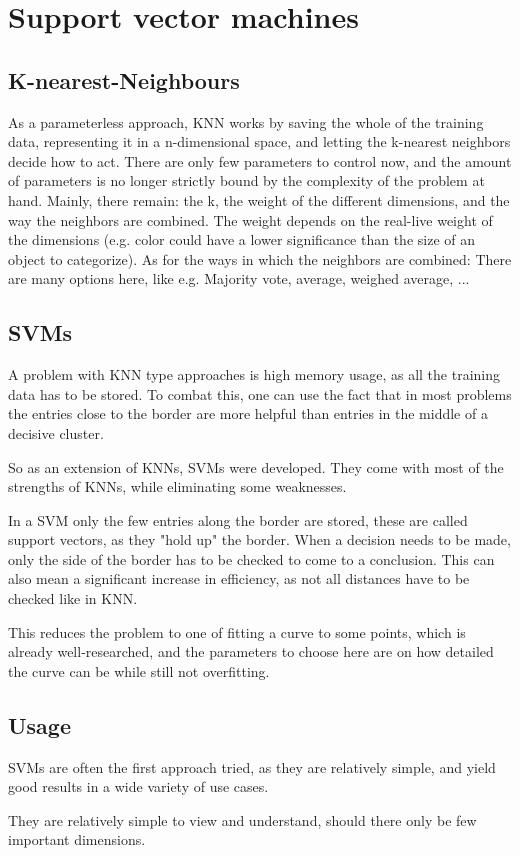 \section{Support vector machines}
\label{sec:SVM}
\subsection{K-nearest-Neighbours}
As a parameterless approach, KNN works by saving the whole of the training data, representing it in a n-dimensional space, and letting the k-nearest neighbors decide how to act. There are only few parameters to control now, and the amount of parameters is no longer strictly bound by the complexity of the problem at hand. Mainly, there remain: the k, the weight of the different dimensions, and the way the neighbors are combined. 
The weight depends on the real-live weight of the dimensions (e.g. color could have a lower significance than the size of an object to categorize).
As for the ways in which the neighbors are combined: There are many options here, like e.g. Majority vote, average, weighed average, ...
\subsection{SVMs}
A problem with KNN type approaches is high memory usage, as all the training data has to be stored. To combat this, one can use the fact that in most problems the entries close to the border are more helpful than entries in the middle of a decisive cluster.

So as an extension of KNNs, SVMs were developed. They come with most of the strengths of KNNs, while eliminating some weaknesses.

In a SVM only the few entries along the border are stored, these are called support vectors, as they "hold up" the border. When a decision needs to be made, only the side of the border has to be checked to come to a conclusion. This can also mean a significant increase in efficiency, as not all distances have to be checked like in KNN.

This reduces the problem to one of fitting a curve to some points, which is already well-researched, and the parameters to choose here are on how detailed the curve can be while still not overfitting.
\subsection{Usage}
SVMs are often the first approach tried, as they are relatively simple, and yield good results in a wide variety of use cases. 

They are relatively simple to view and understand, should there only be few important dimensions.